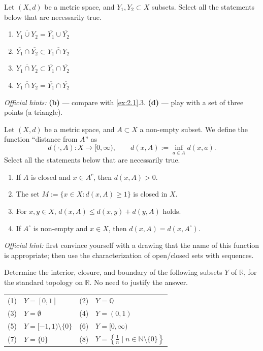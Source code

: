 \begin{exercise}
\label{ex:2.2}
Let $(X,d)$ be a metric space, and $Y_1, Y_2 \subset X$ subsets. Select all the statements below
that are necessarily true.
\begin{enumerate}[label=\textbf{(\alph*)}]
  \item $\overline{Y_1 \cup Y_2} = \overline{Y_1} \cup \overline{Y_2}$
  \item $\overline{Y_1} \cap \overline{Y_2} \subset \overline{Y_1 \cap Y_2}$
  \item $\overline{Y_1 \cap Y_2} \subset \overline{Y_1} \cap \overline{Y_2}$
  \item $\overline{Y_1 \cap Y_2} = \overline{Y_1} \cap \overline{Y_2}$
\end{enumerate}
\textit{Official hints:} \textbf{(b)} --- compare with \cref{ex:2.1}.3. \textbf{(d)} --- play
with a set of three points (a triangle).
\end{exercise}

\begin{exercise}
\label{ex:2.3}
Let $(X,d)$ be a metric space, and $A \subset X$ a non-empty subset. We define the function
``distance from $A$'' as
$$d(\cdot, A) : X \to [0,\infty), \qquad d(x,A) := \inf_{a \in A} d(x,a).$$
Select all the statements below that are necessarily true.
\begin{enumerate}[label=\textbf{(\alph*)}]
  \item If $A$ is closed and $x \in A^c$, then $d(x,A) > 0$.
  \item The set $M := \{x \in X : d(x,A) \geq 1\}$ is closed in $X$.
  \item For $x, y \in X$, $d(x,A) \leq d(x,y) + d(y,A)$ holds.
  \item If $A^\circ$ is non-empty and $x \in X$, then $d(x,A) = d(x, A^\circ)$.
\end{enumerate}
\textit{Official hint:} first convince yourself with a drawing that the name of this function is
appropriate; then use the characterization of open/closed sets with sequences.
\end{exercise}

\begin{exercise}
\label{ex:2.4}
Determine the interior, closure, and boundary of the following subsets $Y$ of $\mathbb{R}$, for
the standard topology on $\mathbb{R}$. No need to justify the answer.
\begin{center}
\begin{tabular}{ll ll}
(1) & $Y = [0,1]$ & (2) & $Y = \mathbb{Q}$ \\
(3) & $Y = \emptyset$ & (4) & $Y = (0,1)$ \\
(5) & $Y = [-1,1) \setminus \{0\}$ & (6) & $Y = [0,\infty)$ \\
(7) & $Y = \{0\}$ & (8) & $Y = \left\{\tfrac{1}{n} \mid n \in \mathbb{N}\setminus\{0\}\right\}$
\end{tabular}
\end{center}
\end{exercise}


